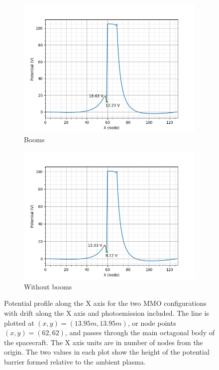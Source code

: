 \begin{figure}[H]
  \begin{subfigure}[b]{0.6\textwidth}
  \includegraphics[width=\textwidth]{figures/MMO/posX/WB/L_posX_WB.png}
  \caption{Booms}
  \label{fig:L_posX_WB}
\end{subfigure}
\begin{subfigure}[b]{0.6\textwidth}
  \includegraphics[width=\textwidth]{figures/MMO/posX/NB/L_posX_NB.png}
  \caption{Without booms}
  \label{fig:L_posX_NB}
\end{subfigure}
\caption{Potential profile along the X axis for the two MMO configurations with drift along the X axis and photoemission included. The line is plotted at $(x,y) = (13.95 m, 13.95 m)$, or node points $(x,y) = (62,62)$, and passes through the main octagonal body of the spacecraft. The X axis units are in number of nodes from the origin. The two values in each plot show the height of the potential barrier formed relative to the ambient plasma.}
\label{fig:Line_posX}
\end{figure}

